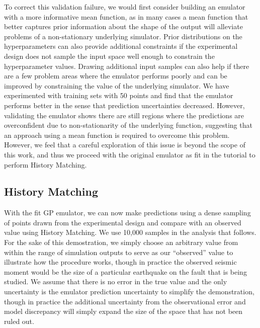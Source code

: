 \documentclass[openacc]{rstransa}%
\begin{document}
To correct this validation failure,
we would first consider building an emulator with
a more informative mean function, as in many cases a mean function that
better captures prior information about the shape of the output
will alleviate problems of a non-stationary
underlying simulator. Prior distributions on the hyperparameters can also
provide additional constraints if the experimental design does not sample
the input space well enough to constrain the hyperparameter values. Drawing
additional input samples can also help if there are a few problem areas
where the emulator performs poorly and can be improved by constraining
the value of the underlying simulator. We have experimented with training
sets with 50 points and find that the emulator performs better in the
sense that prediction uncertainties decreased. However, validating the
emulator shows
there are still regions where the predictions are overconfident due to
non-stationarity of the underlying function, suggesting that an approach
using a mean function is required to overcome this problem. However, we
feel that a careful exploration of this issue is beyond the scope of this
work, and thus we
proceed with the original emulator as fit in the tutorial to perform
History Matching.

\subsection{History Matching}

With the fit GP emulator, we can now make predictions using a dense sampling of points drawn from the
experimental design and compare with an observed value using History Matching. We use 10,000 samples
in the analysis that follows. For the sake of this demostration, we simply choose an arbitrary value
from within the range of simulation outputs to serve as our ``observed'' value to illustrate how the
procedure works, though in practice the observed seismic moment would be the size of a particular
earthquake on the fault that is being studied. We assume that there is no error in the true value
and the only uncertainty is the emulator prediction uncertainty to simplify the demonstration, though
in practice the additional uncertainty from the observational error and model discrepancy will simply
expand the size of the space that has not been ruled out.
\end{document}
